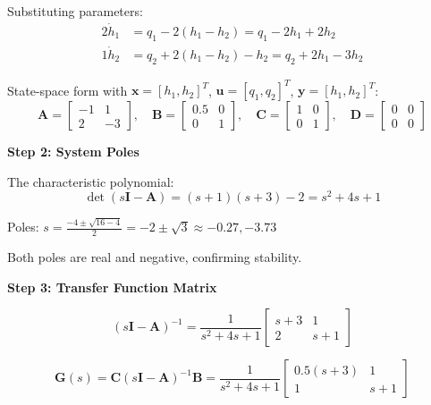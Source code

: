 Substituting parameters:
\begin{align}
2\dot{h}_1 &= q_1 - 2(h_1 - h_2) = q_1 - 2h_1 + 2h_2 \\
1\dot{h}_2 &= q_2 + 2(h_1 - h_2) - h_2 = q_2 + 2h_1 - 3h_2
\end{align}

State-space form with $\mathbf{x} = [h_1, h_2]^T$, $\mathbf{u} = [q_1, q_2]^T$, $\mathbf{y} = [h_1, h_2]^T$:
\begin{equation}
\mathbf{A} = \begin{bmatrix} -1 & 1 \\ 2 & -3 \end{bmatrix}, \quad
\mathbf{B} = \begin{bmatrix} 0.5 & 0 \\ 0 & 1 \end{bmatrix}, \quad
\mathbf{C} = \begin{bmatrix} 1 & 0 \\ 0 & 1 \end{bmatrix}, \quad
\mathbf{D} = \begin{bmatrix} 0 & 0 \\ 0 & 0 \end{bmatrix}
\end{equation}

\textbf{Step 2: System Poles}

The characteristic polynomial:
\begin{equation}
\det(s\mathbf{I} - \mathbf{A}) = (s+1)(s+3) - 2 = s^2 + 4s + 1
\end{equation}

Poles: $s = \frac{-4 \pm \sqrt{16-4}}{2} = -2 \pm \sqrt{3} \approx -0.27, -3.73$

Both poles are real and negative, confirming stability.

\textbf{Step 3: Transfer Function Matrix}

\begin{equation}
(s\mathbf{I} - \mathbf{A})^{-1} = \frac{1}{s^2+4s+1}\begin{bmatrix} s+3 & 1 \\ 2 & s+1 \end{bmatrix}
\end{equation}

\begin{equation}
\mathbf{G}(s) = \mathbf{C}(s\mathbf{I}-\mathbf{A})^{-1}\mathbf{B} = \frac{1}{s^2+4s+1}\begin{bmatrix} 0.5(s+3) & 1 \\ 1 & s+1 \end{bmatrix}
\end{equation}

